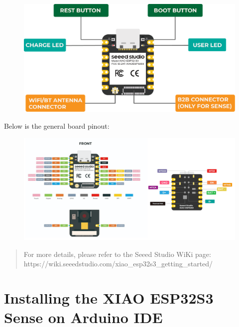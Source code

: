 \documentclass[
  letterpaper,
  DIV=11,
  numbers=noendperiod]{scrreprt}
\begin{document}
\begin{figure}[H]

{\centering \includegraphics{images/imgs_esp32s3_setup/3.png}

}

\end{figure}

Below is the general board pinout:

\begin{figure}[H]

{\centering \includegraphics{images/imgs_esp32s3_setup/2.png}

}

\end{figure}

\begin{quote}
For more details, please refer to the Seeed Studio WiKi page:
https://wiki.seeedstudio.com/xiao\_esp32s3\_getting\_started/
\end{quote}

\hypertarget{installing-the-xiao-esp32s3-sense-on-arduino-ide}{%
\section*{Installing the XIAO ESP32S3 Sense on Arduino
IDE}\label{installing-the-xiao-esp32s3-sense-on-arduino-ide}}
\end{document}
